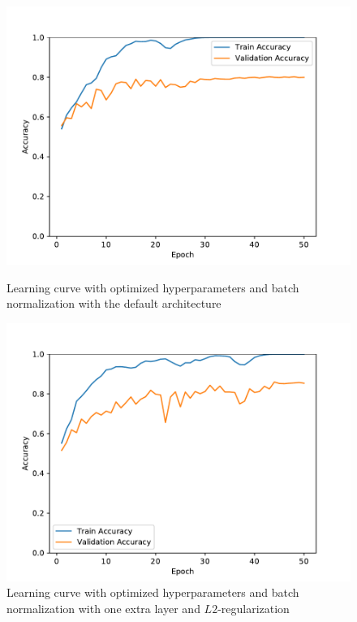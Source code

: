 \documentclass{article}
\begin{document}
\begin{figure}[t]
    \begin{minipage}[t]{0.5\textwidth}\centering
      \includegraphics[width=\linewidth]{figures/default_bn.pdf}
      \caption{Learning curve with optimized hyperparameters and batch
        normalization with the default architecture}\label{fig:default}
    \end{minipage}
    \begin{minipage}[t]{0.5\textwidth}\centering
      \includegraphics[width=\linewidth]{figures/best.pdf}
      \caption{Learning curve with optimized hyperparameters and batch
        normalization with one extra layer and
        $L2$-regularization}\label{fig:best}
  \end{minipage}
\end{figure}
\end{document}
